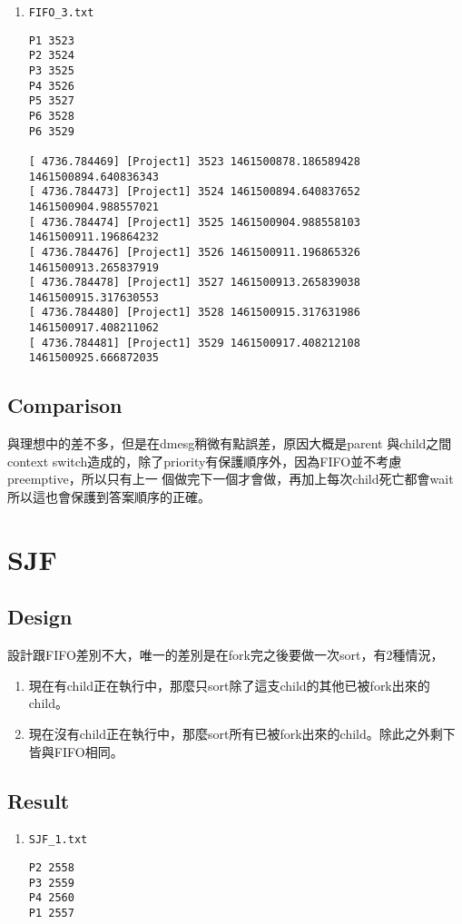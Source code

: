 \documentclass{article}
\begin{document}
\begin{CJK}{UTF8}{bkai}
\begin{enumerate}
\begin{verbatim}
[ 4517.340523] [Project1] 3515 1461500526.987120466 1461500691.939705154
[ 4517.340527] [Project1] 3516 1461500691.939706083 1461500702.258074897
[ 4517.340529] [Project1] 3517 1461500702.258075945 1461500704.295347989
[ 4517.340531] [Project1] 3518 1461500704.295349110 1461500706.332647694
\end{verbatim}
  \item \texttt{FIFO\_3.txt}
\begin{verbatim}
P1 3523
P2 3524
P3 3525
P4 3526
P5 3527
P6 3528
P6 3529

[ 4736.784469] [Project1] 3523 1461500878.186589428 1461500894.640836343
[ 4736.784473] [Project1] 3524 1461500894.640837652 1461500904.988557021
[ 4736.784474] [Project1] 3525 1461500904.988558103 1461500911.196864232
[ 4736.784476] [Project1] 3526 1461500911.196865326 1461500913.265837919
[ 4736.784478] [Project1] 3527 1461500913.265839038 1461500915.317630553
[ 4736.784480] [Project1] 3528 1461500915.317631986 1461500917.408211062
[ 4736.784481] [Project1] 3529 1461500917.408212108 1461500925.666872035
\end{verbatim}
\end{enumerate}

\subsection{Comparison}
與理想中的差不多，但是在dmesg稍微有點誤差，原因大概是parent 與child之間context
switch造成的，除了priority有保護順序外，因為FIFO並不考慮preemptive，所以只有上一
個做完下一個才會做，再加上每次child死亡都會wait所以這也會保護到答案順序的正確。

\section{SJF}

\subsection{Design}
設計跟FIFO差別不大，唯一的差別是在fork完之後要做一次sort，有2種情況，
\begin{enumerate}
\item 現在有child正在執行中，那麼只sort除了這支child的其他已被fork出來的child。
\item 現在沒有child正在執行中，那麼sort所有已被fork出來的child。除此之外剩下皆與FIFO相同。
\end{enumerate}

\subsection{Result}
\begin{enumerate}
\item \texttt{SJF\_1.txt}
\begin{verbatim}
P2 2558
P3 2559
P4 2560
P1 2557


\end{verbatim}
\end{enumerate}
\end{CJK}
\end{document}
